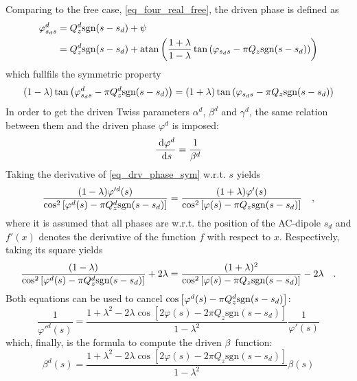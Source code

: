 %
Comparing to the free case, \eqref{eq_four_real_free}, the driven phase is defined as 
%
\begin{align}
  \varphi^d_{s_ds} &=  Q^{d}_{z}\text{sgn}(s-s_d) + \psi\notag\\
  &=  Q^{d}_{z}\text{sgn}(s-s_d)
  + \mathrm{atan}\left( \frac{1+\lambda}{1-\lambda}\tan\left( \varphi_{s_ds}-\pi Q_z\text{sgn}(s-s_d)\right) \right)
\end{align}
%
which fullfils the symmetric property
%
\begin{equation}
  (1-\lambda)\tan\left( \varphi^d_{s_ds} -\pi Q^{d}_{z}\text{sgn}(s-s_d) \right)
  =
  (1+\lambda)\tan\left( \varphi_{s_ds} -\pi Q_z\text{sgn}(s-s_d) \right)
  \label{eq_drv_phase_sym}
\end{equation}
%
In order to get the driven Twiss parameters $\alpha^d$, $\beta^d$ and $\gamma^d$, the same relation
between them and the driven phase $\varphi^d$ is imposed:
\begin{equation}
  \frac{\;\text{d} \varphi^d}{\;\text{d} s} = \frac{1}{\beta^d}
\end{equation}
%
Taking the derivative of  \eqref{eq_drv_phase_sym} w.r.t. $s$ yields
%
\begin{equation}
  \frac{(1-\lambda)\varphi'^d(s)}{\cos^2\left[ \varphi^d(s) - \pi Q^{d}_{z}\text{sgn}(s-s_d) \right]}
  =
  \frac{(1+\lambda)\varphi'(s)}{\cos^2\left[ \varphi(s) - \pi Q_z\text{sgn}(s-s_d) \right]}
  \quad ,
\end{equation}
%
where it is assumed that all phases are w.r.t. the position of the AC-dipole $s_d$ and $f'(x)$ denotes
the derivative of the function $f$ with respect to $x$.
Respectively, taking its square yields
\begin{equation}
  \frac{(1-\lambda)}{\cos^2\left[ \varphi^d(s) - \pi Q^{d}_{z}\text{sgn}(s-s_d) \right]} +2\lambda
  =
  \frac{(1+\lambda)^2}{\cos^2\left[ \varphi(s) - \pi Q_z\text{sgn}(s-s_d) \right]} -2\lambda
  \quad .
  \label{<+label+>}
\end{equation}
%
Both equations can be used to cancel $\cos\left[ \varphi^d(s) - \pi Q^{d}_{z}\text{sgn}(s-s_d) \right]$:
%
\begin{equation}
  \frac{1}{\varphi'^d(s)} = 
  \frac{1+\lambda^2-2\lambda\cos\left[ 2\varphi(s) - 2\pi Q_z\text{sgn}(s-s_d)\right]}{1-\lambda^2}
  \frac{1}{\varphi'(s)}
\end{equation}
%
which, finally, is the formula to compute the driven $\beta$~function:
%
\begin{equation}
  \beta^d(s) =
  \frac{1+\lambda^2-2\lambda\cos\left[ 2\varphi(s) - 2\pi Q_z\text{sgn}(s-s_d)\right]}{1-\lambda^2}
  \beta(s)
\end{equation}
